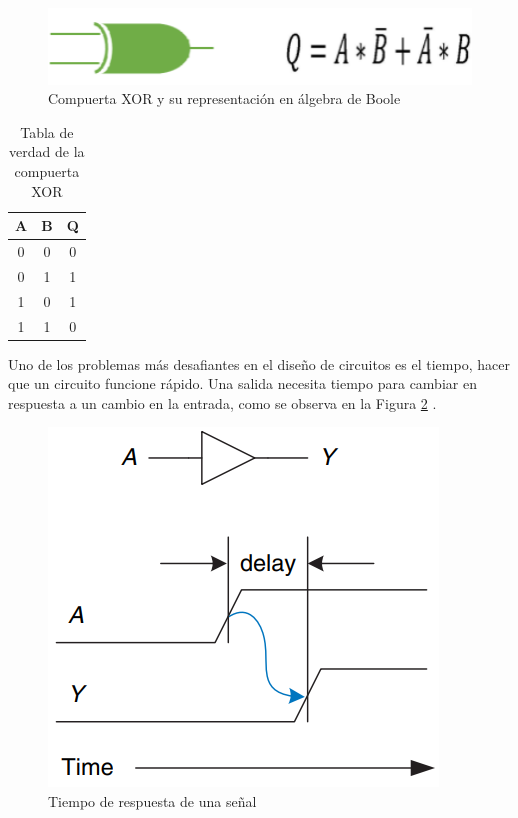 \documentclass[journal]{IEEEtran}
\begin{document}
\begin{itemize}
		\begin{figure}[!htb]
			\centering
			\includegraphics[scale = 0.4]{img/XOR.png}
			\caption{Compuerta XOR y su representación en álgebra de Boole \cite{Tocci2007}}
			\label{fig:XOR}
		\end{figure}
		
		\begin{table}[!htb]
			\centering
			\begin{tabular}{|c|c|c|}
				\hline
				A & B & Q \\
				\hline
				\hline
				0 & 0 & 0 \\
				\hline
				0 & 1 & 1 \\
				\hline
				1 & 0 & 1 \\
				\hline
				1 & 1 & 0 \\
				\hline
			\end{tabular}
			\caption{Tabla de verdad de la compuerta XOR}
			\label{tab:XOR}
		\end{table}
	\end{itemize}
	
	
	
	Uno de los problemas más desafiantes en el diseño de circuitos es el tiempo, hacer que un circuito funcione rápido. Una salida necesita tiempo para cambiar en respuesta a un cambio en la entrada, como se observa en la Figura \ref{fit:delay} \cite{SarahL.Harris2010}.
	
	\begin{figure}[hbtp]
		\centering
		\includegraphics[scale = 0.4]{img/delay.png}
		\caption{Tiempo de respuesta de una señal \cite{SarahL.Harris2010}}
		\label{fit:delay}
	\end{figure}
\end{document}
